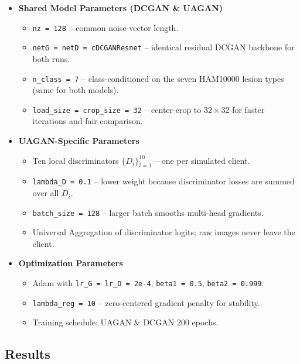 \documentclass{article}
\begin{document}
\begin{itemize}
\item \textbf{Shared Model Parameters (DCGAN \& UAGAN)}
  \begin{itemize}
    \item \texttt{nz = 128} – common noise-vector length. 
    \item \texttt{netG = netD = cDCGANResnet} – identical residual DCGAN backbone for both runs. 
    \item \texttt{n\_class = 7} – class-conditioned on the seven HAM10000 lesion types (same for both models). 
    \item \texttt{load\_size = crop\_size = 32} – center-crop to \(32\times32\) for faster iterations and fair comparison.
  \end{itemize}

\item \textbf{UAGAN-Specific Parameters}
  \begin{itemize}
    \item Ten local discriminators \(\{D_i\}_{i=1}^{10}\)\,—one per simulated client. 
    \item \texttt{lambda\_D = 0.1} – lower weight because discriminator losses are summed over all \(D_i\). 
    \item \texttt{batch\_size = 128} – larger batch smooths multi-head gradients. 
    \item Universal Aggregation of discriminator logits; raw images never leave the client.
  \end{itemize}

\item \textbf{Optimization Parameters}
  \begin{itemize}
    \item Adam with \texttt{lr\_G = lr\_D = 2e-4}, \texttt{beta1 = 0.5}, \texttt{beta2 = 0.999}. 
    \item \texttt{lambda\_reg = 10} – zero-centered gradient penalty for stability. 
    \item Training schedule: UAGAN \& DCGAN \(200\) epochs.
  \end{itemize}


\end{itemize}


\subsection{Results}
\end{document}
